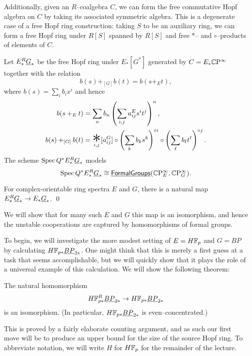\begin{definition}
Additionally, given an $R$--coalgebra $C$, we can form the free commutative Hopf algebra on $C$ by taking its associated symmetric algebra.  This is a degenerate case of a free Hopf ring construction: taking $S$ to be an auxiliary ring, we can form a free Hopf ring under $R[S]$ spanned by $R[S]$ and free $\ast$-- and $\circ$--products of elements of $C$.
\end{definition}

\begin{definition}
Let $E_*^R \underline{\smash{G}}_{*}$ be the free Hopf ring under $E_*[G^*]$ generated by $C = E_* \mathbb{C}\mathrm P^\infty$ together with the relation \[b(s) +_{[G]} b(t) = b(s +_E t),\] where $b(s) = \sum_i b_i x^i$ and hence
\begin{align*}
b(s +_E t) & = \sum_n b_n \left(\sum_{i, j} a_{ij}^E s^i t^j \right)^n, \\
b(s) +_{[G]} b(t) & = \bigast_{i, j} [a_{ij}^G] \circ \left( \sum_k b_k s^k \right)^{\circ i} \circ \left( \sum_\ell b_\ell t^\ell \right)^{\circ j}.
\end{align*}
The scheme $\operatorname{Spec} Q^* E_*^R \underline{\smash{G}}_{*}$ models \[\operatorname{Spec} Q^* E_*^R \underline{\smash{G}}_{*} \cong \operatorname{\underline{\smash{\mathsf{FormalGroups}}}}(\mathbb{C}\mathrm P^\infty_E, \mathbb{C}\mathrm P^\infty_G).\]
\end{definition}

\begin{lemma}\label{ComparisonMapInCOUnstableCoopns}
For complex-orientable ring spectra $E$ and $G$, there is a natural map $E_*^R \underline{\smash{G}}_{*} \to E_* \underline{\smash{G}}_{*}$. \qed
\end{lemma}

\noindent We will show that for many such $E$ and $G$ this map is an isomorphism, and hence the unstable cooperations are captured by homomorphisms of formal groups.

To begin, we will investigate the more modest setting of $E = H\mathbb F_p$ and $G = BP$ by calculating $H\mathbb F_{p*} \underline{\smash{BP}}_{2*}$.  One might think that this is merely a first guess at a task that seems accomplishable, but we will quickly show that it plays the role of a universal example of this calculation.  We will show the following theorem:
\begin{theorem}\label{HFpBPCooperationsTheorem}
The natural homomorphism \[H\mathbb F_{p*}^R \underline{\smash{BP}}_{2*} \to H\mathbb F_{p*} \underline{\smash{BP}}_{2*}\] is an isomorphism.  (In particular, $H\mathbb F_{p*} \underline{\smash{BP}}_{2*}$ is even--concentrated.)
\end{theorem}
\noindent This is proved by a fairly elaborate counting argument, and as such our first move will be to produce an upper bound for the size of the source Hopf ring.  To abbreviate notation, we will write $H$ for $H\mathbb F_p$ for the remainder of the lecture.

